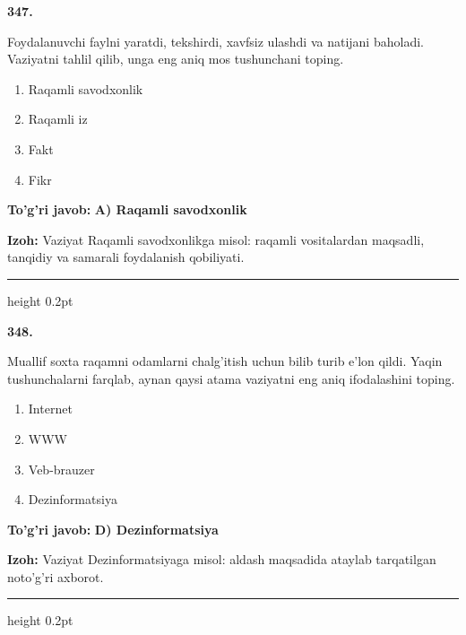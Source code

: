 \documentclass[10pt,a4paper,oneside]{article}
\begin{document}
\noindent\textbf{\color{ink}347.}
\par
Foydalanuvchi faylni yaratdi, tekshirdi, xavfsiz ulashdi va natijani baholadi. Vaziyatni tahlil qilib, unga eng aniq mos tushunchani toping.
\begin{enumerate}[label=\Alph*),leftmargin=9mm]
\item Raqamli savodxonlik
\item Raqamli iz
\item Fakt
\item Fikr
\end{enumerate}
\begin{tcolorbox}[enhanced,breakable,colback=teal!4,colframe=teal!50!black,boxrule=0.5pt,arc=1.1mm,left=3mm,right=3mm,top=1.7mm,bottom=1.7mm,before skip=2mm,after skip=2mm]
\textbf{\color{teal}To'g'ri javob:} \textbf{A) Raqamli savodxonlik}
\par\smallskip
\textbf{Izoh:} Vaziyat Raqamli savodxonlikga misol: raqamli vositalardan maqsadli, tanqidiy va samarali foydalanish qobiliyati.
\end{tcolorbox}
\vspace{2mm}\hrule height 0.2pt \vspace{3mm}

\noindent\textbf{\color{ink}348.}
\par
Muallif soxta raqamni odamlarni chalg'itish uchun bilib turib e'lon qildi. Yaqin tushunchalarni farqlab, aynan qaysi atama vaziyatni eng aniq ifodalashini toping.
\begin{enumerate}[label=\Alph*),leftmargin=9mm]
\item Internet
\item WWW
\item Veb-brauzer
\item Dezinformatsiya
\end{enumerate}
\begin{tcolorbox}[enhanced,breakable,colback=teal!4,colframe=teal!50!black,boxrule=0.5pt,arc=1.1mm,left=3mm,right=3mm,top=1.7mm,bottom=1.7mm,before skip=2mm,after skip=2mm]
\textbf{\color{teal}To'g'ri javob:} \textbf{D) Dezinformatsiya}
\par\smallskip
\textbf{Izoh:} Vaziyat Dezinformatsiyaga misol: aldash maqsadida ataylab tarqatilgan noto'g'ri axborot.
\end{tcolorbox}
\vspace{2mm}\hrule height 0.2pt \vspace{3mm}
\end{document}
